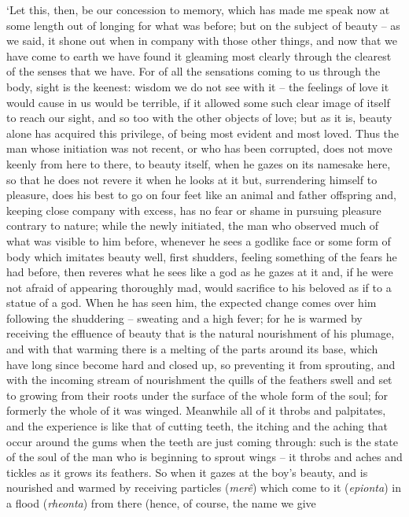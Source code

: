 ‘Let this, then, be our concession to memory, which has made me speak
now at some length out of longing for what was
before; but on the
subject of beauty -- as we said, it shone out  when in company
with those other things, and now that we have come to earth we have
found it gleaming most clearly through the clearest of the senses that
we have. For of all the sensations coming to us through the body, sight
is the keenest: wisdom we do not see with it -- the feelings of love it
would  cause in us would be terrible, if it allowed some such
clear image of itself to reach our sight, and so too with the other
objects of love; but as
it is, beauty alone has acquired this privilege, of being most evident
and most loved. Thus the man  whose initiation was not recent,
or who has been corrupted, does not move keenly from here to there, to
beauty itself, when he gazes on its namesake here, so that he does not
revere it when he looks at it but, surrendering himself to pleasure,
does his best to go on four feet like an animal and father offspring
 and, keeping close company with
excess, has no fear or
shame  in pursuing pleasure contrary to nature; while the
newly initiated, the man who observed much of what was visible to him
before, whenever he sees a godlike face or some form of body which
imitates beauty well, first shudders, feeling something of the fears he
had before, then reveres what he sees like  a god as he gazes at
it and, if he were not afraid of appearing thoroughly mad, would
sacrifice to his beloved as if to a statue of a god. When he has seen
him, the expected change comes  over him following the
shuddering -- sweating and a high fever; for he is warmed by receiving
the effluence of beauty that is the natural nourishment of his plumage,
and with that warming there is a melting of the parts around its base,
which have  long since become hard and closed up, so preventing
it from sprouting, and with the incoming stream of nourishment the
quills of the feathers swell and set to growing from their roots under
the surface of the whole form of the soul; for formerly  the
whole of it was winged. Meanwhile all of it throbs and palpitates, and
the experience is like that of cutting teeth, the itching and the aching
that occur around the gums when the teeth are just coming through: such
is the state of the soul of  the man who is beginning to sprout
wings -- it throbs and aches and tickles as it grows its feathers. So
when it gazes at the boy's beauty, and is nourished and warmed by
receiving particles ({\em merê}) which come to it ({\em epionta}) in a
flood ({\em rheonta}) from there (hence, of course, the name we give
